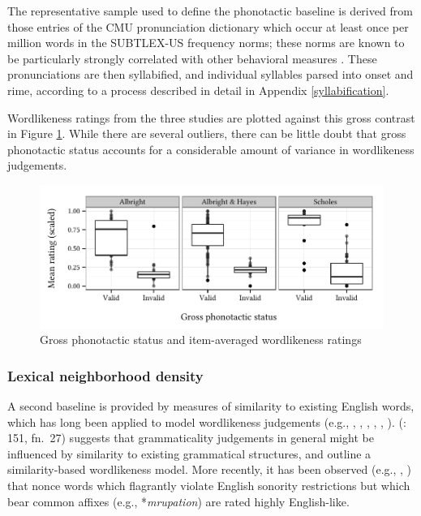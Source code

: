 The representative sample used to define the phonotactic baseline is derived from those entries of the CMU pronunciation dictionary which occur at least once per million words in the SUBTLEX-US frequency norms; these norms are known to be particularly strongly correlated with other behavioral measures \citep{Brysbaert2009}.
These pronunciations are then syllabified, and individual syllables parsed into onset and rime, according to a process described in detail in Appendix \ref{syllabification}.

Wordlikeness ratings from the three studies are plotted against this gross contrast in Figure \ref{boxplot}.
While there are several outliers, there can be little doubt that gross phonotactic status accounts for a considerable amount of variance in wordlikeness judgements.

\begin{figure}[t]
\centering
\includegraphics{boxplot.pdf}
\caption{Gross phonotactic status and item-averaged wordlikeness ratings}
\label{boxplot}
\end{figure}

\subsubsection{Lexical neighborhood density}

A second baseline is provided by measures of similarity to existing English words, which has long been applied to model wordlikeness judgements (e.g., \citealt{Bailey2001}, \citealt{Greenberg1964}, \citealt{Kirby2007}, \citealt{Ohala1986b}, \citealt{Shademan2006,Shademan2007}, \citealt{Vitevitch1998,Vitevitch1999a}). 
\citeauthor{LSLT} (\citeyear{LSLT}: 151, fn.~27) suggests that grammaticality judgements in general might be influenced by similarity to existing grammatical structures, and \citet[417f.]{SPE} outline a similarity-based wordlikeness model. 
More recently, it has been observed (e.g., \citealt[51]{Coleman1997}, \citealt{Hay2004a}) that nonce words which flagrantly violate English sonority restrictions but which bear common affixes (e.g., *\emph{mrupation}) are rated highly English-like.

